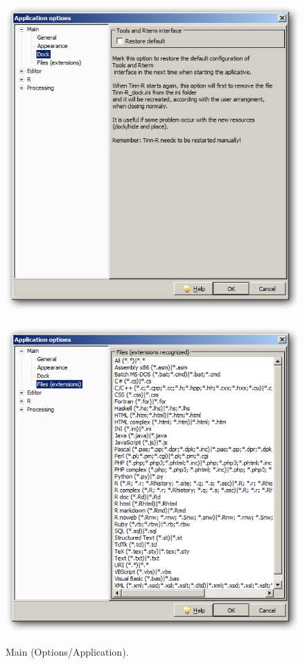 \begin{figure}[h!]
  \includegraphics[scale=0.35]{./res/app_main_dock.png}~~
  \includegraphics[scale=0.35]{./res/app_main_files.png}\\
  \caption{Main (Options/Application).}
  \label{fig:app_main_options}
\end{figure}

